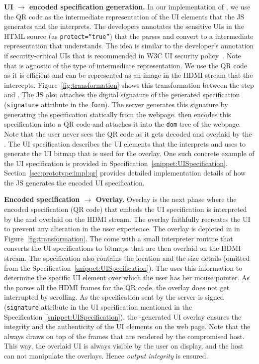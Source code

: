 \begin{mylist}
\item \textbf{UI $\rightarrow$ encoded specification generation.} In our implementation of \name, we use the QR code as the intermediate representation of the UI elements that the \name JS generates and the \device interprets. The developers annotates the sensitive UIs in the HTML source (as \texttt{protect=``true''}) that the \name \js parses and convert to a intermediate representation that \device understands. The idea is similar to the developer's annotation if security-critical UIs that is recommended in W3C UI security policy~\cite{w3c_spec}. Note that \name is agnostic of the type of intermediate representation. We use the QR code as it is efficient and can be represented as an image in the HDMI stream that the \device intercepts. Figure~\ref{fig:transformation} shows this transformation between the step \one and \two. The \name JS also attaches the digital signature of the generated specification (\texttt{signature} attribute in the \texttt{form}). The server generates this signature by generating the specification statically from the webpage. \name \js then encodes this specification into a QR code and attaches it into the \texttt{dom} tree of the webpage. Note that the user never sees the QR code as it gets decoded and overlaid by the \device. The UI specification describes the UI elements that the \device interprets and uses to generate the UI bitmap that is used for the overlay. One such concrete example of the UI specification is provided in Specification~\ref{snippet:UISpecification}. Section~\ref{sec:prototype:impl:qr} provides detailed implementation details of how the \name JS generates the encoded UI specification. 

\item \textbf{Encoded specification $\rightarrow$ Overlay.} Overlay is the next phase where the encoded specification (QR code) that embeds the UI specification is interpreted by the \device and overlaid on the HDMI stream. The overlay faithfully recreates the UI to prevent any alteration in the user experience. The \device overlay is depicted in \three in Figure~\ref{fig:transformation}. The \device come with a small interpreter routine that converts the UI specifications to bitmaps that are then overlaid on the HDMI stream. The specification also contains the location and the size details (omitted from the Specification~\ref{snippet:UISpecification}). The \device uses this information to determine the specific UI element over which the user has her mouse pointer. As the \device parses all the HDMI frames for the QR code, the overlay does not get interrupted by scrolling. As the specification sent by the server is signed (\texttt{signature} attribute in the UI specification mentioned in the Specification~\ref{snippet:UISpecification}), the \device-generated UI overlay ensures the integrity and the authenticity of the UI elements on the web page. Note that the \device always draws on top of the frames that are rendered by the compromised host. This way, the overlaid UI is always visible by the user on display, and the host can not manipulate the overlays. Hence \emph{output integrity} is ensured.

\end{mylist}

